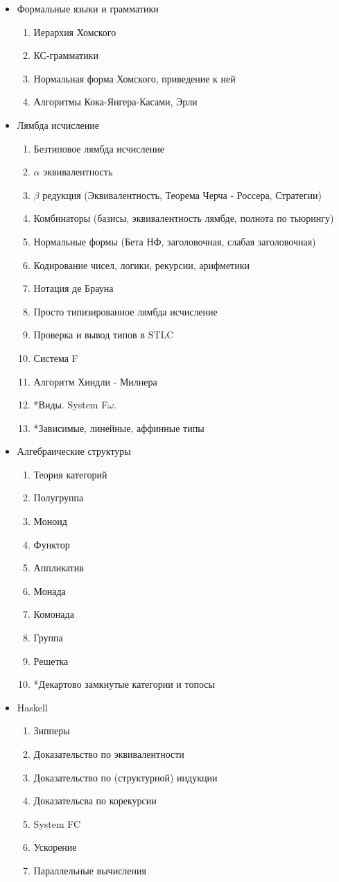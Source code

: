 \documentclass[10pt,a4paper]{article}
\theoremstyle{definition}
\begin{document}
\begin{itemize}
\begin{enumerate}
  \end{enumerate}
\item Формальные языки и грамматики
  \begin{enumerate}
  \item Иерархия Хомского
  \item КС-грамматики
  \item Нормальная форма Хомского, приведение к ней
  \item Алгоритмы  Кока-Янгера-Касами, Эрли    
  \end{enumerate}  
\item Лямбда исчисление
  \begin{enumerate}
  \item Безтиповое лямбда исчисление
  \item $\alpha$ эквивалентность
  \item $\beta$ редукция (Эквивалентность, Теорема Черча - Россера, Стратегии)
  \item Комбинаторы (базисы, эквивалентность лямбде, полнота по тьюрингу)
  \item Нормальные формы (Бета НФ, заголовочная, слабая заголовочная)
  \item Кодирование чисел, логики, рекурсии, арифметики
  \item Нотация де Брауна
  \item Просто типизированное лямбда исчисление
  \item Проверка и вывод типов в STLC
  \item Система F
  \item Алгоритм Хиндли - Милнера
  \item *Виды. System F$\omega$.    
  \item *Зависимые, линейные, аффинные типы
  \end{enumerate}
\item Алгебраические структуры
  \begin{enumerate}
  \item Теория категорий
  \item Полугруппа
  \item Моноид
  \item Функтор
  \item Аппликатив
  \item Монада
  \item Комонада
  \item Группа
  \item Решетка
  \item *Декартово замкнутые категории и топосы
  \end{enumerate}
\item Haskell
  \begin{enumerate}
  \item Зипперы
  \item Доказательство по эквивалентности
  \item Доказательство по (структурной) индукции
  \item Доказательсва по корекурсии   
  \item System FC  
  \item Ускорение
  \item Параллельные вычисления
    

\end{enumerate}
\end{itemize}
\end{document}
